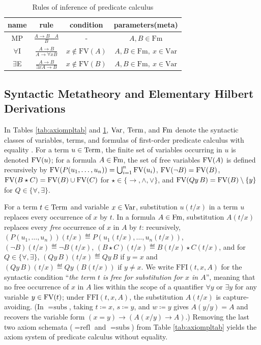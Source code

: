 \documentclass[10pt,a4paper]{article}
\begin{document}
\begin{table}[H]
\centering
\caption{Rules of inference of predicate calculus}
\label{tab:rulestab}
\begin{tabular}{|c|c|c|c|}
\hline
name & rule & condition & parameters(meta) \\ \hline
\hline
MP & \rule[-2.5ex]{0pt}{7ex} $\frac{A\to B\quad A}{B}$ & - & $A,B \in \textrm{Fm}$ \\ \hline
\hline
\rule[-2.5ex]{0pt}{7ex}
$\forall$I & $\frac{A\to B}{A\to \forall x B}$ & $x \notin \textrm{FV}(A)$ & $A,B \in \textrm{Fm},\ x \in \textrm{Var}$ \\ \hline
\hline
\rule[-2.5ex]{0pt}{7ex}
$\exists$E & $\frac{A\to B}{\exists x A\to B}$ & $x \notin \textrm{FV}(B)$ & $A,B \in \textrm{Fm},\ x \in \textrm{Var}$ \\ \hline
\end{tabular}
\end{table}

\subsection{Syntactic Metatheory and Elementary Hilbert Derivations}\label{sec:hilbert_logic}
In Tables \ref{tab:axiompltab} and \ref{tab:rulestab}, ${\textrm{Var}}$, ${\textrm{Term}}$, and ${\textrm{Fm}}$ denote the syntactic classes of variables, terms, and formulas of first-order predicate calculus with equality \cite{Mendelson2015,TakeutiZaring1982}. For a term $u \in {\textrm{Term}}$, the finite set of variables occurring in $u$ is denoted ${\textrm{FV}}(u)$; for a formula $A \in {\textrm{Fm}}$, the set of free variables ${\textrm{FV}}(A)$ is defined recursively by ${\textrm{FV}}(P(u_1,\dots,u_n)) = \bigcup_{i=1}^n {\textrm{FV}}(u_i)$, ${\textrm{FV}}(\neg B) = {\textrm{FV}}(B)$, ${\textrm{FV}}(B \star C) = {\textrm{FV}}(B) \cup {\textrm{FV}}(C)$ for $\star \in \{\to, \land, \lor\}$, and ${\textrm{FV}}(Qy\, B) = {\textrm{FV}}(B) \setminus \{y\}$ for $Q \in \{\forall, \exists\}$.

For a term $t \in {\textrm{Term}}$ and variable $x \in {\textrm{Var}}$, substitution $u(t/x)$ in a term $u$ replaces every occurrence of $x$ by $t$. In a formula $A \in {\textrm{Fm}}$, substitution $A(t/x)$ replaces every \emph{free} occurrence of $x$ in $A$ by $t$: recursively, $(P(u_1,\dots,u_n))(t/x) \eqdef P(u_1(t/x),\dots,u_n(t/x))$, $(\neg B)(t/x) \eqdef \neg B(t/x)$, $(B \star C)(t/x) \eqdef B(t/x) \star C(t/x)$, and for $Q \in \{\forall, \exists\}$, $(Qy\, B)(t/x) \eqdef Qy\, B$ if $y = x$ and $(Qy\, B)(t/x) \eqdef Qy\, (B(t/x))$ if $y \neq x$. We write $\textrm{FFI}(t,x,A)$ for the syntactic condition ``\emph{the term $t$ is free for substitution for $x$ in $A$}'', meaning that no free occurrence of $x$ in $A$ lies within the scope of a quantifier $\forall y$ or $\exists y$ for any variable $y \in {\textrm{FV}}(t)$; under $\textrm{FFI}(t,x,A)$, the substitution $A(t/x)$ is capture-avoiding. (In $=\textrm{subs}$, taking $t \coloneqq x$, $s \coloneqq y$, and $w \coloneqq y$ gives $A(y/y) = A$ and recovers the variable form $(x = y) \to (A(x/y) \to A)$.) Removing the last two axiom schemata ($=\textrm{refl}$ and $=\textrm{subs}$) from Table \ref{tab:axiompltab} yields the axiom system of predicate calculus without equality.
\end{document}
